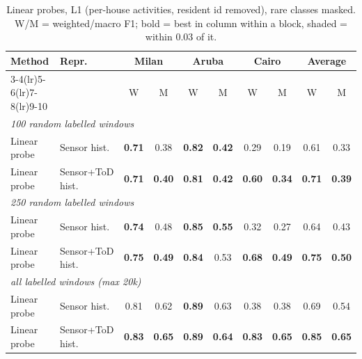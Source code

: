 \begin{table}[H]
\centering\small
\caption{Linear probes, L1 (per-house activities, resident id removed), rare classes masked. W/M = weighted/macro F1; bold = best in column within a block, shaded = within 0.03 of it.}
\label{tab:probe_l1_masked}
\setlength{\tabcolsep}{3.5pt}
\begin{tabular}{llcc|cc|cc|cc}
\toprule
Method & Repr. & \multicolumn{2}{c}{Milan} & \multicolumn{2}{c}{Aruba} & \multicolumn{2}{c}{Cairo} & \multicolumn{2}{c}{Average} \\
\cmidrule(lr){3-4}\cmidrule(lr){5-6}\cmidrule(lr){7-8}\cmidrule(lr){9-10}
 & & W & M & W & M & W & M & W & M \\
\midrule
\multicolumn{10}{l}{\textit{100 random labelled windows}} \\
\midrule
Linear probe & Sensor hist. & \cellcolor{blue!12}\textbf{0.71} & \cellcolor{blue!12}0.38 & \cellcolor{blue!12}\textbf{0.82} & \cellcolor{blue!12}\textbf{0.42} & 0.29 & 0.19 & 0.61 & 0.33 \\
Linear probe & Sensor+ToD hist. & \cellcolor{blue!12}\textbf{0.71} & \cellcolor{blue!12}\textbf{0.40} & \cellcolor{blue!12}\textbf{0.81} & \cellcolor{blue!12}\textbf{0.42} & \cellcolor{blue!12}\textbf{0.60} & \cellcolor{blue!12}\textbf{0.34} & \cellcolor{blue!12}\textbf{0.71} & \cellcolor{blue!12}\textbf{0.39} \\
\midrule
\multicolumn{10}{l}{\textit{250 random labelled windows}} \\
\midrule
Linear probe & Sensor hist. & \cellcolor{blue!12}\textbf{0.74} & \cellcolor{blue!12}0.48 & \cellcolor{blue!12}\textbf{0.85} & \cellcolor{blue!12}\textbf{0.55} & 0.32 & 0.27 & 0.64 & 0.43 \\
Linear probe & Sensor+ToD hist. & \cellcolor{blue!12}\textbf{0.75} & \cellcolor{blue!12}\textbf{0.49} & \cellcolor{blue!12}\textbf{0.84} & \cellcolor{blue!12}0.53 & \cellcolor{blue!12}\textbf{0.68} & \cellcolor{blue!12}\textbf{0.49} & \cellcolor{blue!12}\textbf{0.75} & \cellcolor{blue!12}\textbf{0.50} \\
\midrule
\multicolumn{10}{l}{\textit{all labelled windows (max 20k)}} \\
\midrule
Linear probe & Sensor hist. & \cellcolor{blue!12}0.81 & \cellcolor{blue!12}0.62 & \cellcolor{blue!12}\textbf{0.89} & \cellcolor{blue!12}0.63 & 0.38 & 0.38 & 0.69 & 0.54 \\
Linear probe & Sensor+ToD hist. & \cellcolor{blue!12}\textbf{0.83} & \cellcolor{blue!12}\textbf{0.65} & \cellcolor{blue!12}\textbf{0.89} & \cellcolor{blue!12}\textbf{0.64} & \cellcolor{blue!12}\textbf{0.83} & \cellcolor{blue!12}\textbf{0.65} & \cellcolor{blue!12}\textbf{0.85} & \cellcolor{blue!12}\textbf{0.65} \\
\bottomrule
\end{tabular}
\end{table}

